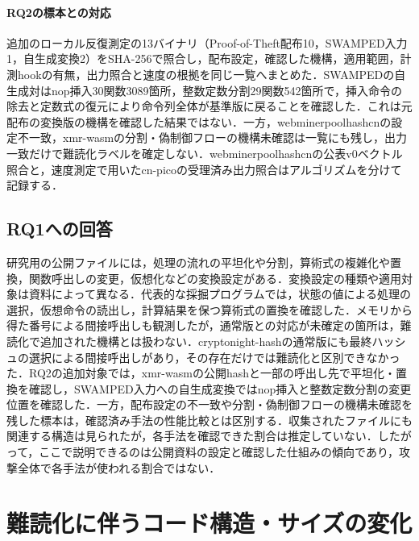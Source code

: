\documentclass[submit,techrep]{ipsj}
\begin{document}
\paragraph{RQ2の標本との対応}追加のローカル反復測定の13バイナリ（Proof-of-Theft配布10，SWAMPED入力1，自生成変換2）をSHA-256で照合し，配布設定，確認した機構，適用範囲，計測hookの有無，出力照合と速度の根拠を同じ一覧へまとめた．SWAMPEDの自生成対はnop挿入30関数3089箇所，整数定数分割29関数542箇所で，挿入命令の除去と定数式の復元により命令列全体が基準版に戻ることを確認した．これは元配布の変換版の機構を確認した結果ではない．一方，webminerpoolhashcnの設定不一致，xmr-wasmの分割・偽制御フローの機構未確認は一覧にも残し，出力一致だけで難読化ラベルを確定しない．webminerpoolhashcnの公表v0ベクトル照合と，速度測定で用いたcn-picoの受理済み出力照合はアルゴリズムを分けて記録する．

\subsection{RQ1への回答}
研究用の公開ファイルには，処理の流れの平坦化や分割，算術式の複雑化や置換，関数呼出しの変更，仮想化などの変換設定がある．変換設定の種類や適用対象は資料によって異なる．代表的な採掘プログラムでは，状態の値による処理の選択，仮想命令の読出し，計算結果を保つ算術式の置換を確認した．メモリから得た番号による間接呼出しも観測したが，通常版との対応が未確定の箇所は，難読化で追加された機構とは扱わない．cryptonight-hashの通常版にも最終ハッシュの選択による間接呼出しがあり，その存在だけでは難読化と区別できなかった．RQ2の追加対象では，xmr-wasmの公開hashと一部の呼出し先で平坦化・置換を確認し，SWAMPED入力への自生成変換ではnop挿入と整数定数分割の変更位置を確認した．一方，配布設定の不一致や分割・偽制御フローの機構未確認を残した標本は，確認済み手法の性能比較とは区別する．収集されたファイルにも関連する構造は見られたが，各手法を確認できた割合は推定していない．したがって，ここで説明できるのは公開資料の設定と確認した仕組みの傾向であり，攻撃全体で各手法が使われる割合ではない．

\section{難読化に伴うコード構造・サイズの変化}
\end{document}
